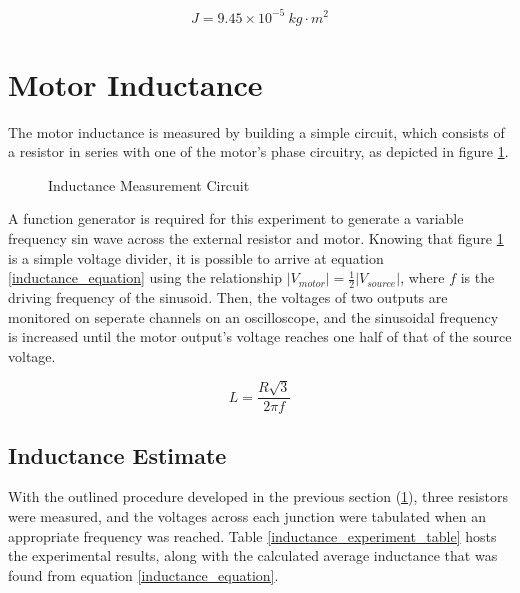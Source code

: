 \begin{tcolorbox}[
	standard jigsaw,
	opacityback=0]
	\[J = 9.45 \times 10^{-5} \ kg \cdot m^2 \]
\end{tcolorbox}


\section{Motor Inductance}
\label{section_motor_inductance}

The motor inductance is measured by building a simple circuit, which consists of a resistor in series with one of the motor's phase circuitry, as depicted in figure \ref{inductance_measurement}.

\begin{figure}[H]
	\caption[Inductance Measurement Circuit]{Inductance Measurement Circuit}
	\label{inductance_measurement}
	\centering
	
\end{figure}

A function generator is required for this experiment to generate a variable frequency sin wave across the external resistor and motor. Knowing that figure \ref{inductance_measurement} is a simple voltage divider, it is possible to arrive at equation \ref{inductance_equation} using the relationship $\lvert V_{motor} \rvert = \frac{1}{2} \lvert V_{source} \rvert$, where $f$ is the driving frequency of the sinusoid. Then, the voltages of two outputs are monitored on seperate channels on an oscilloscope, and the sinusoidal frequency is increased until the motor output's voltage reaches one half of that of the source voltage.


\begin{equation}
\label{inductance_equation}
L = \frac{R\sqrt{3}}{2\pi f}
\end{equation}

\subsection{Inductance Estimate}
With the outlined procedure developed in the previous section (\ref{section_motor_inductance}), three resistors were measured, and the voltages across each junction were tabulated when an appropriate frequency was reached. Table \ref{inductance_experiment_table} hosts the experimental results, along with the calculated average inductance that was found from equation \ref{inductance_equation}.

